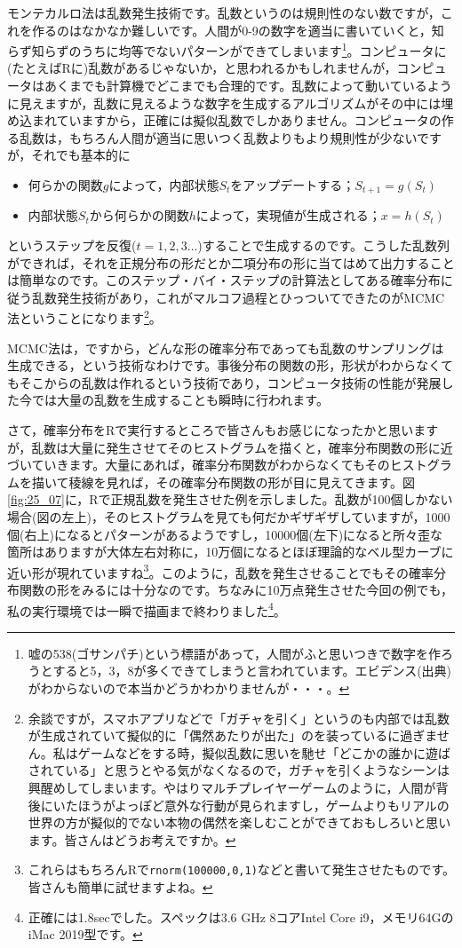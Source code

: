 \documentclass{ltjsarticle}
\begin{document}
モンテカルロ法は乱数発生技術です。乱数というのは規則性のない数ですが，これを作るのはなかなか難しいです。人間が0-9の数字を適当に書いていくと，知らず知らずのうちに均等でないパターンができてしまいます\footnote{嘘の538(ゴサンパチ)という標語があって，人間がふと思いつきで数字を作ろうとすると5，3，8が多くできてしまうと言われています。エビデンス(出典)がわからないので本当かどうかわかりませんが・・・。}。コンピュータに(たとえばRに)乱数があるじゃないか，と思われるかもしれませんが，コンピュータはあくまでも計算機でどこまでも合理的です。乱数によって動いているように見えますが，乱数に見えるような数字を生成するアルゴリズムがその中には埋め込まれていますから，正確には擬似乱数でしかありません。コンピュータの作る乱数は，もちろん人間が適当に思いつく乱数よりもより規則性が少ないですが，それでも基本的に
\begin{itemize}
	\item 何らかの関数$g$によって，内部状態$S_t$をアップデートする；$S_{t+1}=g(S_t)$
	\item 内部状態$S_t$から何らかの関数$h$によって，実現値が生成される；$x = h(S_t)$
\end{itemize}
というステップを反復($t=1,2,3\ldots$)することで生成するのです。こうした乱数列ができれば，それを正規分布の形だとか二項分布の形に当てはめて出力することは簡単なのです。このステップ・バイ・ステップの計算法としてある確率分布に従う乱数発生技術があり，これがマルコフ過程とひっついてできたのがMCMC法ということになります\footnote{余談ですが，スマホアプリなどで「ガチャを引く」というのも内部では乱数が生成されていて擬似的に「偶然あたりが出た」のを装っているに過ぎません。私はゲームなどをする時，擬似乱数に思いを馳せ「どこかの誰かに遊ばされている」と思うとやる気がなくなるので，ガチャを引くようなシーンは興醒めしてしまいます。やはりマルチプレイヤーゲームのように，人間が背後にいたほうがよっぽど意外な行動が見られますし，ゲームよりもリアルの世界の方が擬似的でない本物の偶然を楽しむことができておもしろいと思います。皆さんはどうお考えですか。}。

MCMC法は，ですから，どんな形の確率分布であっても乱数のサンプリングは生成できる，という技術なわけです。事後分布の関数の形，形状がわからなくてもそこからの乱数は作れるという技術であり，コンピュータ技術の性能が発展した今では大量の乱数を生成することも瞬時に行われます。

さて，確率分布をRで実行するところで皆さんもお感じになったかと思いますが，乱数は大量に発生させてそのヒストグラムを描くと，確率分布関数の形に近づいていきます。大量にあれば，確率分布関数がわからなくてもそのヒストグラムを描いて稜線を見れば，その確率分布関数の形が目に見えてきます。図\ref{fig:25_07}に，Rで正規乱数を発生させた例を示しました。乱数が100個しかない場合(図の左上)，そのヒストグラムを見ても何だかギザギザしていますが，1000個(右上)になるとパターンがあるようですし，10000個(左下)になると所々歪な箇所はありますが大体左右対称に，10万個になるとほぼ理論的なベル型カーブに近い形が現れていますね\footnote{これらはもちろんRで\texttt{rnorm(100000,0,1)}などと書いて発生させたものです。皆さんも簡単に試せますよね。}。このように，乱数を発生させることでもその確率分布関数の形をみるには十分なのです。ちなみに10万点発生させた今回の例でも，私の実行環境では一瞬で描画まで終わりました\footnote{正確には1.8secでした。スペックは3.6 GHz 8コアIntel Core i9，メモリ64GのiMac 2019型です。}。
\end{document}
